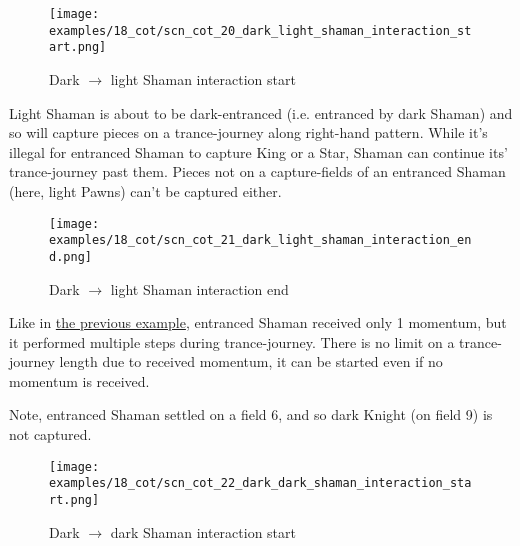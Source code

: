 \clearpage %

\noindent
\begin{figure}[!h]
\texttt{[image: examples/18\_cot/scn\_cot\_20\_dark\_light\_shaman\_interaction\_start.png]}
\caption{Dark $\rightarrow$ light Shaman interaction start}
\label{fig:scn_cot_20_dark_light_shaman_interaction_start}
\end{figure}

Light Shaman is about to be dark-entranced (i.e. entranced by dark Shaman) and so will capture
pieces on a trance-journey along right-hand pattern. While it's illegal for entranced Shaman
to capture King or a Star, Shaman can continue its' trance-journey past them. Pieces not on
a capture-fields of an entranced Shaman (here, light Pawns) can't be captured either.

\clearpage %

\noindent
\begin{figure}[!h]
\texttt{[image: examples/18\_cot/scn\_cot\_21\_dark\_light\_shaman\_interaction\_end.png]}
\caption{Dark $\rightarrow$ light Shaman interaction end}
\label{fig:scn_cot_21_dark_light_shaman_interaction_end}
\end{figure}

Like in \hyperref[fig:scn_cot_18_light_light_shaman_interaction_start]{the previous example},
entranced Shaman received only 1 momentum, but it performed multiple steps during trance-journey.
There is no limit on a trance-journey length due to received momentum, it can be started even if
no momentum is received.

Note, entranced Shaman settled on a field 6, and so dark Knight (on field 9) is not captured.

\clearpage %

\noindent
\begin{figure}[!h]
\texttt{[image: examples/18\_cot/scn\_cot\_22\_dark\_dark\_shaman\_interaction\_start.png]}
\caption{Dark $\rightarrow$ dark Shaman interaction start}
\label{fig:scn_cot_22_dark_dark_shaman_interaction_start}
\end{figure}

